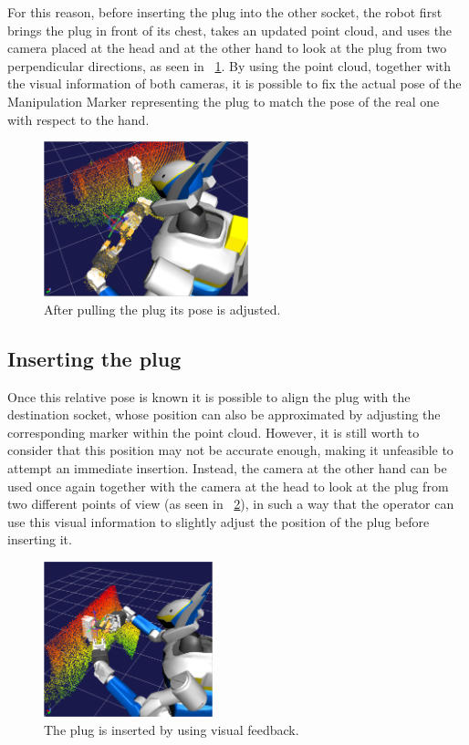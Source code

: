		For this reason, before inserting the plug into the other socket, the robot first brings the plug
		in front of its chest, takes an updated point cloud, and uses the camera placed at the head and
		at the other hand to look at the plug from two perpendicular directions, as seen in
		\figurename~\ref{fig:WatchPlug}.
		By using the point cloud, together with the visual information of both cameras, it is possible to
		fix the actual pose of the Manipulation Marker representing the plug to match the pose of
		the real one with respect to the hand.
		
		\begin{figure}[t]
			\centering
			\includegraphics[height = 4.5cm]{img/WatchPlug}
			\caption{After pulling the plug its pose is adjusted.}
			\label{fig:WatchPlug}
		\end{figure}
		
	\subsection{Inserting the plug}
		
		Once this relative pose is known it is possible to align the plug with the destination socket,
		whose position can also be approximated by adjusting the corresponding marker within the point cloud.
		However, it is still worth to consider that this position may not be accurate enough,
		making it unfeasible to attempt an immediate insertion.
		Instead, the camera at the other hand can be used once again together with the camera at the head to
		look at the plug from two different points of view (as seen in \figurename~\ref{fig:InsertPlug}),
		in such a way that the operator can use this visual	information to slightly adjust the position of the
		plug before inserting it.
		
		\begin{figure}[b]
			\centering
			\includegraphics[height = 4.5cm]{img/InsertPlug}
			\caption{The plug is inserted by using visual feedback.}
			\label{fig:InsertPlug}
		\end{figure}
		
